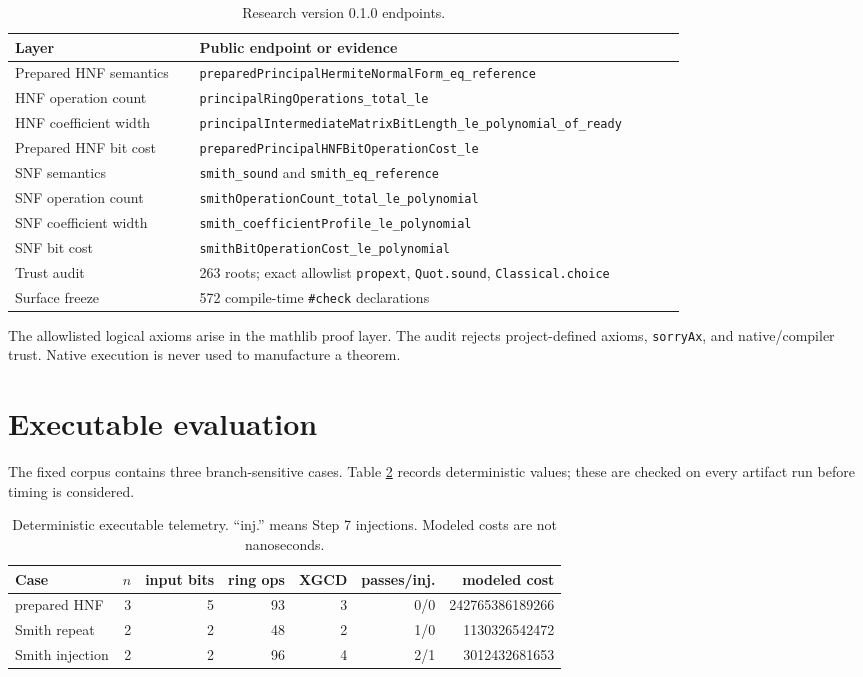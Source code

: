 \documentclass[11pt]{article}
\newcommand{\code}[1]{\texttt{#1}}
\begin{document}
\begin{table}[ht]
\centering
\small
\begin{tabular}{p{0.25\linewidth}p{0.66\linewidth}}
\toprule
Layer & Public endpoint or evidence \\
\midrule
Prepared HNF semantics &
\code{preparedPrincipalHermiteNormalForm\_eq\_reference} \\
HNF operation count &
\code{principalRingOperations\_total\_le} \\
HNF coefficient width &
\code{principalIntermediateMatrixBitLength\_le\_polynomial\_of\_ready} \\
Prepared HNF bit cost &
\code{preparedPrincipalHNFBitOperationCost\_le} \\
SNF semantics &
\code{smith\_sound} and \code{smith\_eq\_reference} \\
SNF operation count &
\code{smithOperationCount\_total\_le\_polynomial} \\
SNF coefficient width &
\code{smith\_coefficientProfile\_le\_polynomial} \\
SNF bit cost &
\code{smithBitOperationCost\_le\_polynomial} \\
Trust audit & 263 roots; exact allowlist
\code{propext}, \code{Quot.sound}, \code{Classical.choice} \\
Surface freeze & 572 compile-time \code{\#check} declarations \\
\bottomrule
\end{tabular}
\caption{Research version 0.1.0 endpoints.}
\label{tab:endpoints}
\end{table}

The allowlisted logical axioms arise in the mathlib proof layer.  The audit
rejects project-defined axioms, \code{sorryAx}, and native/compiler trust.
Native execution is never used to manufacture a theorem.

\section{Executable evaluation}

The fixed corpus contains three branch-sensitive cases.  Table
\ref{tab:cases} records deterministic values; these are checked on every
artifact run before timing is considered.

\begin{table}[ht]
\centering
\small
\begin{tabular}{lrrrrrr}
\toprule
Case & \(n\) & input bits & ring ops & XGCD & passes/inj. & modeled cost \\
\midrule
prepared HNF & 3 & 5 & 93 & 3 & 0/0 & 242765386189266 \\
Smith repeat & 2 & 2 & 48 & 2 & 1/0 & 1130326542472 \\
Smith injection & 2 & 2 & 96 & 4 & 2/1 & 3012432681653 \\
\bottomrule
\end{tabular}
\caption{Deterministic executable telemetry.  ``inj.'' means Step 7
injections.  Modeled costs are not nanoseconds.}
\label{tab:cases}
\end{table}
\end{document}
